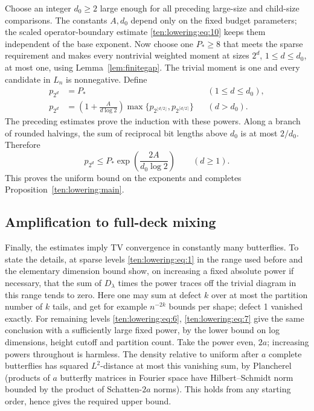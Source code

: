 Choose an integer $d_0\ge2$ large enough for all preceding
large-size and child-size comparisons. The constants $A,d_0$ depend
only on the fixed budget parameters; the scaled operator-boundary
estimate \eqref{ten:lowering:eq:10} keeps them independent of the
base exponent. Now choose one $P_*\ge8$ that meets the sparse
requirement and makes every nontrivial weighted moment at sizes
$2^d$, $1\le d\le d_0$, at most one, using
Lemma~\ref{lem:finitegap}. The trivial moment is one and every
candidate in $L_n$ is nonnegative. Define
\[
 \begin{aligned}
 p_{2^d}&=P_* &&(1\le d\le d_0),\\
 p_{2^d}&=\left(1+\frac{A}{d\log2}\right)
       \max\{p_{2^{\lfloor d/2\rfloor}},
              p_{2^{\lceil d/2\rceil}}\} &&(d>d_0).
 \end{aligned}
\]
The preceding estimates prove the induction with these powers.
Along a branch of rounded halvings, the sum of reciprocal bit
lengths above $d_0$ is at most $2/d_0$. Therefore
\[
 p_{2^d}\le P_*\exp\!\left(\frac{2A}{d_0\log2}\right)
 \qquad(d\ge1).
\]
This proves the uniform bound on the exponents and completes
Proposition~\ref{ten:lowering:main}.

\subsection{Amplification to full-deck mixing}
Finally, the estimates imply TV convergence in constantly many butterflies. To state the details, at sparse levels \eqref{ten:lowering:eq:1} in the range used before and the elementary dimension bound show, on increasing a fixed absolute power if necessary, that the sum of \(D_\lambda\) times the power traces off the trivial diagram in this range tends to zero. Here one may sum at defect \(k\) over at most the partition number of \(k\) tails, and get for example \(n^{-2k}\) bounds per shape; defect 1 vanished exactly. For remaining levels \eqref{ten:lowering:eq:6}, \eqref{ten:lowering:eq:7} give the same conclusion with a sufficiently large fixed power, by the lower bound on log dimensions, height cutoff and partition count. Take the power even, \(2a\); increasing powers throughout is harmless. The density relative to uniform after \(a\) complete butterflies has squared \(L^2\)-distance at most this vanishing sum, by Plancherel (products of \(a\) butterfly matrices in Fourier space have Hilbert--Schmidt norm bounded by the product of Schatten-\(2a\) norms). This holds from any starting order, hence gives the required upper bound.
